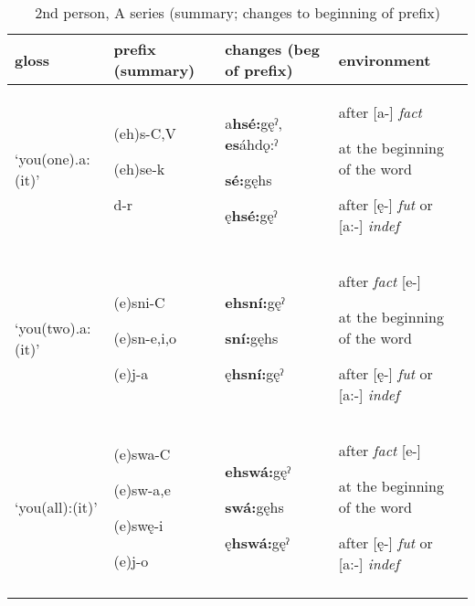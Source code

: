 \begin{table}
\caption{2nd person, A series (summary; changes to beginning of prefix)}
\label{tab:1:2apron}
\tiny{
\begin{tabularx}{\textwidth}{XXXX}
\lsptoprule
gloss & prefix (summary) & changes (beg of prefix) & environment\\
\midrule
‘you(one).a:(it)’ & (eh)s-C,V

(eh)se-k

d-r & a\textbf{hsé:}gęˀ, \textbf{es}áhdǫ:ˀ

\textbf{sé:}gęhs

ę\textbf{hsé:}gęˀ & after [a-] \textit{fact}

at the beginning of the word 

after [ę-] \textit{fut} or [a:-] \textit{indef}\\
‘you(two).a:(it)’ & (e)sni-C

(e)sn-e,i,o

(e)j-a & \textbf{ehsní:}gęˀ

\textbf{sní:}gęhs

ę\textbf{hsní:}gęˀ & after \textit{fact} [e-] 

at the beginning of the word 

after [ę-] \textit{fut} or [a:-] \textit{indef}\\
‘you(all):(it)’ & (e)swa-C

(e)sw-a,e

(e)swę-i

(e)j-o & \textbf{ehswá:}gęˀ

\textbf{swá:}gęhs

ę\textbf{hswá:}gęˀ & after \textit{fact} [e-] 

at the beginning of the word 

after [ę-] \textit{fut} or [a:-] \textit{indef}\\
\lspbottomrule
\end{tabularx}}
\end{table}

\lipsum[1-1]


